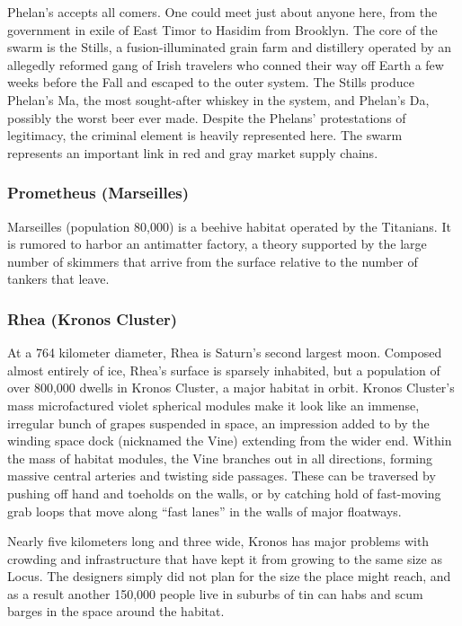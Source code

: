 Phelan's accepts all comers. One could meet just about anyone here, from the government in exile of East Timor to Hasidim from Brooklyn. The core of the swarm is the Stills, a fusion-illuminated grain farm and distillery operated by an allegedly reformed gang of Irish travelers who conned their way off Earth a few weeks before the Fall and escaped to the outer system. The Stills produce Phelan's Ma, the most sought-after whiskey in the system, and Phelan's Da, possibly the worst beer ever made. Despite the Phelans' protestations of legitimacy, the criminal element is heavily represented here. The swarm represents an important link in red and gray market supply chains. 

\subsubsection{Prometheus (Marseilles)} \label{sec:prom-mars} 

Marseilles (population 80,000) is a beehive habitat operated by the Titanians. It is rumored to harbor an antimatter factory, a theory supported by the large number of skimmers that arrive from the surface relative to the number of tankers that leave. 

\subsubsection{Rhea (Kronos Cluster)} \label{sec:rhea-kronos-cluster} 

At a 764 kilometer diameter, Rhea is Saturn's second largest moon. Composed almost entirely of ice, Rhea's surface is sparsely inhabited, but a population of over 800,000 dwells in Kronos Cluster, a major habitat in orbit. Kronos Cluster's mass microfactured violet spherical modules make it look like an immense, irregular bunch of grapes suspended in space, an impression added to by the winding space dock (nicknamed the Vine) extending from the wider end. Within the mass of habitat modules, the Vine branches out in all directions, forming massive central arteries and twisting side passages. These can be traversed by pushing off hand and toeholds on the walls, or by catching hold of fast-moving grab loops that move along “fast lanes” in the walls of major floatways. 

Nearly five kilometers long and three wide, Kronos has major problems with crowding and infrastructure that have kept it from growing to the same size as Locus. The designers simply did not plan for the size the place might reach, and as a result another 150,000 people live in suburbs of tin can habs and scum barges in the space around the habitat. 

